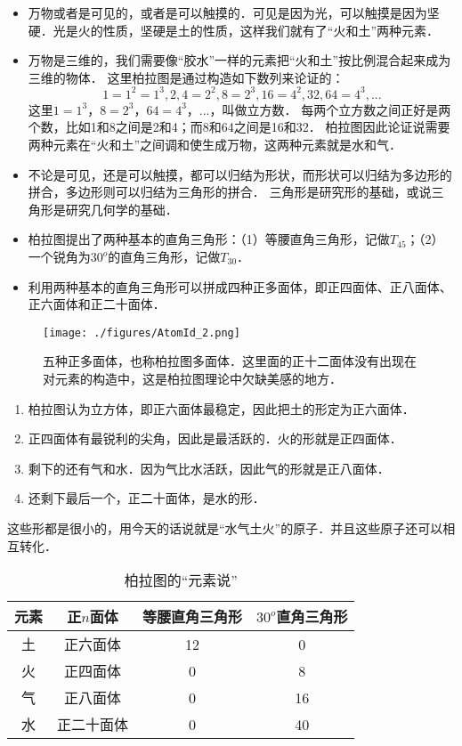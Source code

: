 \begin{itemize}
\item 万物或者是可见的，或者是可以触摸的．可见是因为光，可以触摸是因为坚硬．光是火的性质，坚硬是土的性质，这样我们就有了“火和土”两种元素．

\item 万物是三维的，我们需要像“胶水”一样的元素把“火和土”按比例混合起来成为三维的物体． 这里柏拉图是通过构造如下数列来论证的：
\begin{equation}
1=1^2=1^3, 2, 4=2^2, 8=2^3, 16=4^2, 32, 64=4^3,...
\end{equation}
这里$1=1^3$，$8=2^3$，$64=4^3$，...，叫做立方数． 每两个立方数之间正好是两个数，比如1和8之间是2和4；而8和64之间是16和32． 柏拉图因此论证说需要两种元素在“火和土”之间调和使生成万物，这两种元素就是水和气．

\item 不论是可见，还是可以触摸，都可以归结为形状，而形状可以归结为多边形的拼合，多边形则可以归结为三角形的拼合． 三角形是研究形的基础，或说三角形是研究几何学的基础．

\item 柏拉图提出了两种基本的直角三角形：（1）等腰直角三角形，记做$T_{45}$；（2）一个锐角为$30^o$的直角三角形，记做$T_{30}$．

\item 利用两种基本的直角三角形可以拼成四种正多面体，即正四面体、正八面体、正六面体和正二十面体．
\end{itemize}

\begin{figure}[ht]
\centering
\texttt{[image: ./figures/AtomId\_2.png]}
\caption{五种正多面体，也称柏拉图多面体．这里面的正十二面体没有出现在对元素的构造中，这是柏拉图理论中欠缺美感的地方．} \label{AtomId_fig2}
\end{figure}

\begin{enumerate}
\item 柏拉图认为立方体，即正六面体最稳定，因此把土的形定为正六面体．
\item 正四面体有最锐利的尖角，因此是最活跃的．火的形就是正四面体．
\item 剩下的还有气和水．因为气比水活跃，因此气的形就是正八面体．
\item 还剩下最后一个，正二十面体，是水的形．
\end{enumerate}

这些形都是很小的，用今天的话说就是“水气土火”的原子．并且这些原子还可以相互转化．

\begin{table}[ht]
\centering
\caption{柏拉图的“元素说”}\label{AtomId_tab1}
\begin{tabular}{|c|c|c|c|}
\hline
元素 & 正$n$面体 & 等腰直角三角形 & $30^o$直角三角形 \\
\hline
土 & 正六面体 & 12 & 0  \\
\hline
火 & 正四面体 & 0 & 8 \\
\hline
气 & 正八面体 & 0 & 16 \\
\hline
水 & 正二十面体 & 0 & 40\\
\hline
\end{tabular}
\end{table}


